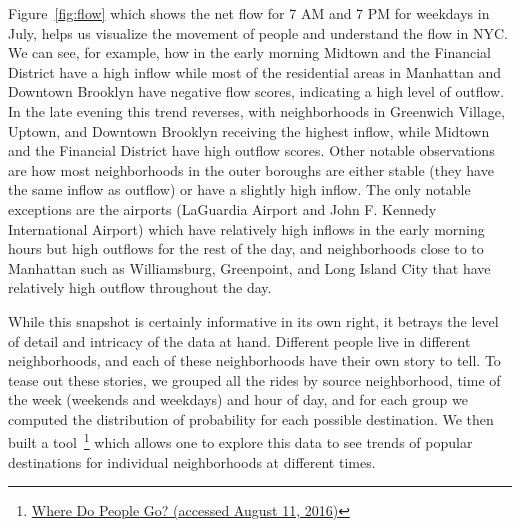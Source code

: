 \documentclass[twocolumn]{article}
\begin{document}
Figure~\ref{fig:flow} which shows the net flow for 7 AM and 7 PM for weekdays in July, helps us visualize the movement of people and understand the flow in NYC. We can see, for example, how in the early morning Midtown and the Financial District have a high inflow while most of the residential areas in Manhattan and Downtown Brooklyn have negative flow scores, indicating a high level of outflow. In the late evening this trend reverses, with neighborhoods in Greenwich Village, Uptown, and Downtown Brooklyn receiving the highest inflow, while Midtown and the Financial District have high outflow scores. Other notable observations are how most neighborhoods in the outer boroughs are either stable (they have the same inflow as outflow) or have a slightly high inflow. The only notable exceptions are the airports (LaGuardia Airport and John F. Kennedy International Airport) which have relatively high inflows in the early morning hours but high outflows for the rest of the day, and neighborhoods close to to Manhattan such as Williamsburg, Greenpoint, and Long Island City that have relatively high outflow throughout the day.

While this snapshot is certainly informative in its own right, it betrays the level of detail and intricacy of the data at hand. Different people live in different neighborhoods, and each of these neighborhoods have their own story to tell. To tease out these stories, we grouped all the rides by source neighborhood, time of the week (weekends and weekdays) and hour of day, and for each group we computed the distribution of probability for each possible destination. We then built a tool~\footnote{\href{http://bit.ly/nyc_taxi}{Where Do People Go? (accessed August 11, 2016)}} which allows one to explore this data to see trends of popular destinations for individual neighborhoods at different times. 
\end{document}
